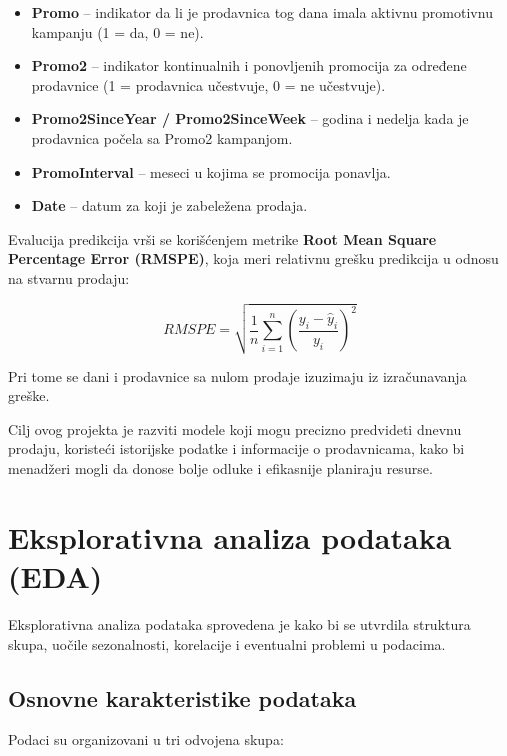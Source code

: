 \documentclass[12pt]{article}
\begin{document}
\begin{itemize}
    \item \textbf{Promo} – indikator da li je prodavnica tog dana imala aktivnu promotivnu kampanju (1 = da, 0 = ne). 
    
    \item \textbf{Promo2} – indikator kontinualnih i ponovljenih promocija za određene prodavnice (1 = prodavnica učestvuje, 0 = ne učestvuje). 
    
    \item \textbf{Promo2SinceYear / Promo2SinceWeek} – godina i nedelja kada je prodavnica počela sa Promo2 kampanjom. 
    
    \item \textbf{PromoInterval} – meseci u kojima se promocija ponavlja.
    
    \item \textbf{Date} – datum za koji je zabeležena prodaja.
\end{itemize}


Evalucija predikcija vrši se korišćenjem metrike \textbf{Root Mean Square Percentage Error (RMSPE)}, koja meri relativnu grešku predikcija u odnosu na stvarnu prodaju:

\[
RMSPE = \sqrt{\frac{1}{n} \sum_{i=1}^{n} \left( \frac{y_i - \hat{y}_i}{y_i} \right)^2}
\]

Pri tome se dani i prodavnice sa nulom prodaje izuzimaju iz izračunavanja greške.  

Cilj ovog projekta je razviti modele koji mogu precizno predvideti dnevnu prodaju, koristeći istorijske podatke i informacije o prodavnicama, kako bi menadžeri mogli da donose bolje odluke i efikasnije planiraju resurse.


\newpage

\section{Eksplorativna analiza podataka (EDA)}

Eksplorativna analiza podataka sprovedena je kako bi se utvrdila struktura skupa, uočile sezonalnosti, korelacije i eventualni problemi u podacima.

\subsection{Osnovne karakteristike podataka}

Podaci su organizovani u tri odvojena skupa:
\end{document}
